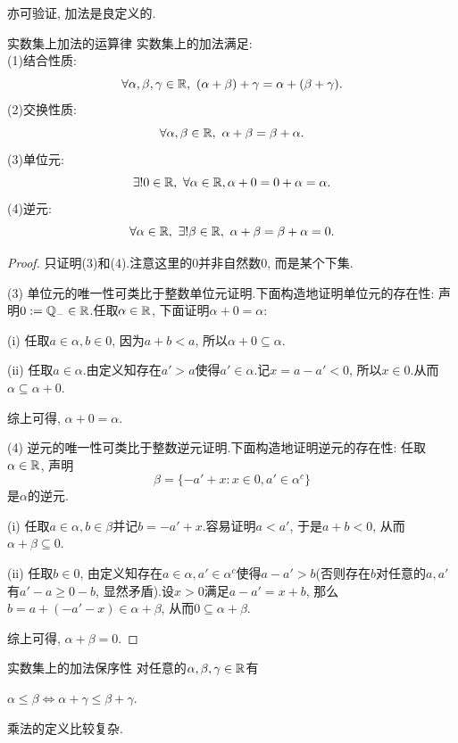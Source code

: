 亦可验证, 加法是良定义的.

\begin{proposition}{实数集上加法的运算律}
	实数集上的加法满足:  \\
	(1)结合性质: $$\forall \alpha , \beta , \gamma \in \mathbb{R} , ~(\alpha + \beta ) + \gamma = \alpha + (\beta + \gamma).$$
	(2)交换性质: $$\forall \alpha , \beta \in \mathbb{R}, ~\alpha + \beta = \beta + \alpha .$$
	(3)单位元: $$\exists ! 0 \in \mathbb{R} , ~\forall \alpha \in \mathbb{R} ,  \alpha + 0 = 0 + \alpha = \alpha .$$
	(4)逆元: $$\forall \alpha \in \mathbb{R} , ~\exists ! \beta \in \mathbb{R} , ~\alpha + \beta = \beta + \alpha = 0.$$
\end{proposition}
\begin{proof}
	只证明(3)和(4).注意这里的$0$并非自然数$0$, 而是某个下集. 
	
	(3) 单位元的唯一性可类比于整数单位元证明.下面构造地证明单位元的存在性: 声明$0 : = \mathbb{Q}_{-} \in \mathbb{R}$.任取$\alpha \in \mathbb{R}$, 下面证明$\alpha + 0 = \alpha$:  
	
	(i) 任取$a \in \alpha , b \in 0$, 因为$a + b < a$, 所以$\alpha + 0 \subseteq \alpha$. 
	
	(ii) 任取$a \in \alpha$.由定义知存在$a'>a$使得$a' \in \alpha$.记$x=a-a'<0$, 所以$x \in 0$.从而$\alpha \subseteq \alpha + 0$. 
	
	综上可得, $\alpha +0 = \alpha$. 
	
	(4) 逆元的唯一性可类比于整数逆元证明.下面构造地证明逆元的存在性: 任取$\alpha \in \mathbb{R}$, 声明$$\beta = \{ -a'+x: x \in 0, a' \in \alpha ^c \}$$是$\alpha$的逆元. 
	
	(i) 任取$a \in \alpha , b \in \beta$并记$b=-a'+x$.容易证明$a<a'$, 于是$a+b <0$, 从而$\alpha + \beta \subseteq 0$. 
	
	(ii) 任取$b \in 0$, 由定义知存在$a \in \alpha , a' \in \alpha ^c$使得$a - a'>b$(否则存在$b$对任意的$a, a'$有$a'-a \geq 0-b$, 显然矛盾).设$x>0$满足$a-a'=x+b$, 那么$b=a+(-a'-x) \in \alpha + \beta$, 从而$0 \subseteq \alpha + \beta$. 
	
	综上可得, $\alpha + \beta = 0$.
\end{proof}

\begin{proposition}{实数集上的加法保序性}
	对任意的$\alpha , \beta , \gamma \in \mathbb{R}$有
	\begin{center}
		$\alpha \leq \beta \Leftrightarrow \alpha + \gamma \leq \beta + \gamma .$
	\end{center}
\end{proposition}

乘法的定义比较复杂.

